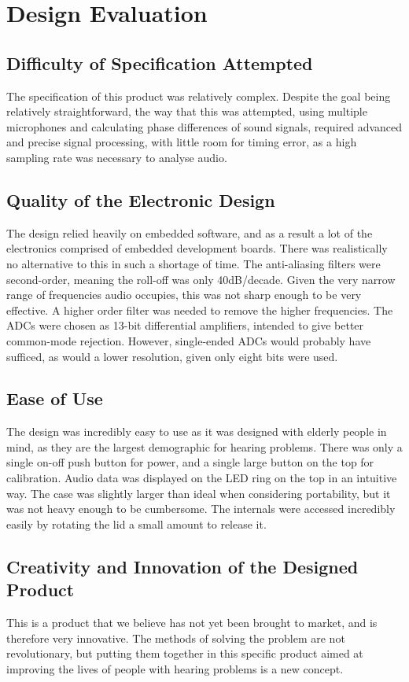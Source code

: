 \documentclass[a4paper]{article}
\begin{document}
\section{Design Evaluation}

\subsection{Difficulty of Specification Attempted}
The specification of this product was
relatively complex. Despite the goal being relatively straightforward, the way
that this was attempted, using multiple microphones and calculating phase
differences of sound signals, required advanced and precise signal processing,
with little room for timing error, as a high sampling rate was necessary to
analyse audio.

\subsection{Quality of the Electronic Design}
The design relied heavily on embedded
software, and as a result a lot of the electronics comprised of embedded
development boards. There was realistically no alternative to this in such a
shortage of time. The anti-aliasing filters were second-order, meaning the
roll-off was only 40dB/decade. Given the very narrow range of frequencies audio
occupies, this was not sharp enough to be very effective. A higher order filter
was needed to remove the higher frequencies.  The ADCs were chosen as 13-bit
differential amplifiers, intended to give better common-mode rejection. However,
single-ended ADCs would probably have sufficed, as would a lower resolution,
given only eight bits were used.

\subsection{Ease of Use}
The design was incredibly easy to use as it was designed with
elderly people in mind, as they are the largest demographic for hearing
problems. There was only a single on-off push button for power, and a single
large button on the top for calibration. Audio data was displayed on the LED
ring on the top in an intuitive way.  The case was slightly larger than ideal
when considering portability, but it was not heavy enough to be cumbersome.  The
internals were accessed incredibly easily by rotating the lid a small amount to
release it.

\subsection{Creativity and Innovation of the Designed Product}
This is a product that we
believe has not yet been brought to market, and is therefore very innovative.
The methods of solving the problem are not revolutionary, but putting them
together in this specific product aimed at improving the lives of people with
hearing problems is a new concept.
\end{document}
